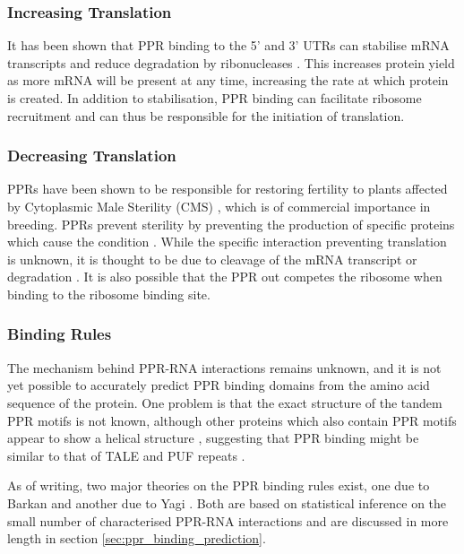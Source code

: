 \subsubsection{Increasing Translation}

It has been shown that PPR binding to the 5' and 3' UTRs can stabilise mRNA
transcripts and reduce degradation by
ribonucleases \citep{Pfalz2009,Prikryl2011}.
This increases protein yield as more mRNA will be present at any time,
increasing the rate at which protein is created.
In addition to stabilisation, PPR binding can facilitate ribosome recruitment
and can thus be responsible for the initiation of translation.

\subsubsection{Decreasing Translation}

PPRs have been shown to be responsible for restoring fertility to plants
affected by Cytoplasmic Male Sterility (CMS) \citep{Bentolila2002}, which is of
commercial importance in breeding.
PPRs prevent sterility by preventing the production of specific proteins which
cause the condition \citep{Kazama2008}.
While the specific interaction preventing translation is unknown, it is thought
to be due to cleavage of the mRNA transcript or degradation \citep{Wang2006}.
It is also possible that the PPR out competes the ribosome when binding to the
ribosome binding site.

\subsubsection{Binding Rules}

The mechanism behind PPR-RNA interactions remains unknown, and it is not yet
possible to accurately predict PPR binding domains from the amino acid sequence
of the protein.
One problem is that the exact structure of the tandem PPR motifs is not known,
although other proteins which also contain PPR motifs appear to show a helical
structure \citep{Ringel2011,Howard2012}, suggesting that PPR binding might be
similar to that of TALE and PUF repeats \citep{Rubinson2012}.

As of writing, two major theories on the PPR binding rules exist, one due to
Barkan \citep{Barkan2012} and another due to Yagi \citep{Yagi2013}.
Both are based on statistical inference on the small number of characterised
PPR-RNA interactions and are discussed in more length in section
\ref{sec:ppr_binding_prediction}.

